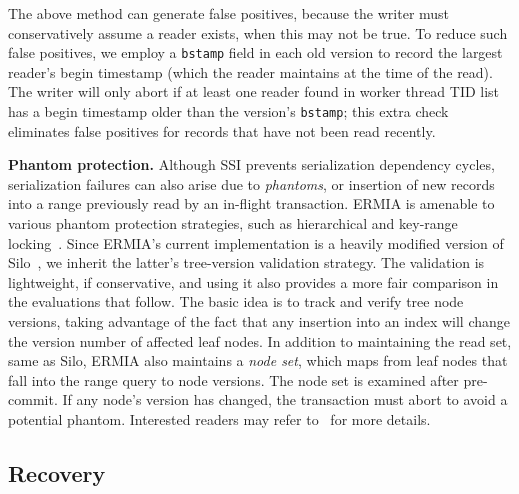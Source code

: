 The above method can generate false positives, because the writer must conservatively assume a reader exists, when this may not be true. To reduce such false positives, we employ a \texttt{bstamp} field in each old version to record the largest reader's begin timestamp (which the reader maintains at the time of the read). The writer will only abort if at least one reader found in worker thread TID list has a begin timestamp older than the version's \texttt{bstamp}; this extra check eliminates false positives for records that have not been read recently.

{\bf Phantom protection.} Although SSI prevents serialization dependency cycles, serialization failures can also arise due to {\em phantoms}, or insertion of new records into a range previously read by an in-flight transaction. ERMIA is amenable to various phantom protection strategies, such as hierarchical and key-range locking~\cite{KimuraGK12,Lomet93}. Since ERMIA's current implementation
is a heavily modified version of Silo~\cite{TuZKLM13}, we inherit the latter's tree-version validation strategy. The validation is lightweight, if conservative, and using it also provides a more fair comparison in the evaluations that follow. The basic idea is to track and verify tree node versions, taking advantage of the fact that any insertion into an index will change the version number of affected leaf nodes. In addition to maintaining the read set, same as Silo, ERMIA also maintains a \textit{node set}, which maps from leaf nodes that fall into the range query to node versions. The node set is examined after pre-commit. If any node's version has changed, the transaction must abort to avoid a potential phantom. Interested readers may refer to~\cite{TuZKLM13} for more details.

\subsection{Recovery}

